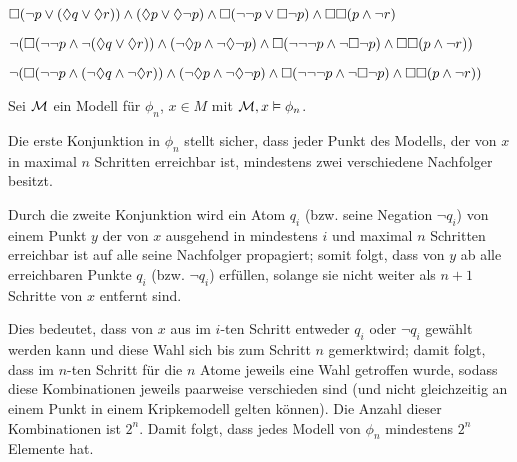 \begin{center}
$ \Box(\neg p \vee (\lozenge q \vee \lozenge r)) \wedge (\lozenge p \vee \lozenge \neg p) \wedge
\Box (\neg \neg p \vee \Box \neg p) \wedge \Box \Box (p \wedge \neg r) $

$ \neg(\Box (\neg\neg p \wedge \neg(\lozenge q \vee \lozenge r)) \wedge (\neg\lozenge p
\wedge \neg\lozenge\neg p) \wedge \Box (\neg\neg\neg p \wedge \neg\Box\neg p) \wedge \Box\Box (p \wedge \neg r)) $

$ \neg(\Box (\neg\neg p \wedge (\neg\lozenge q \wedge \neg\lozenge r)) \wedge (\neg\lozenge p
\wedge \neg\lozenge\neg p) \wedge \Box (\neg\neg\neg p \wedge \neg\Box\neg p) \wedge \Box\Box (p \wedge \neg r)) $
\end{center}







Sei $\mathcal{M}$ ein Modell für $\phi_n$, $x\in M$ mit $\mathcal{M}, x \vDash
\phi_n$.

Die erste Konjunktion in $\phi_n$ stellt sicher, dass jeder Punkt des
Modells, der von $x$ in maximal $n$ Schritten erreichbar ist, mindestens zwei
verschiedene Nachfolger besitzt.

Durch die zweite Konjunktion wird ein Atom $q_i$ (bzw. seine Negation $\neg q_i$)
von einem Punkt $y$ der von $x$ ausgehend in mindestens $i$ und maximal $n$
Schritten erreichbar ist auf alle seine Nachfolger propagiert; somit folgt,
dass von $y$ ab alle erreichbaren Punkte $q_i$ (bzw. $\neg q_i$) erfüllen,
solange sie nicht weiter als $n+1$ Schritte von $x$ entfernt sind.

Dies bedeutet, dass von $x$ aus im $i$-ten Schritt entweder $q_i$ oder $\neg
q_i$ gewählt werden kann und diese Wahl sich bis zum Schritt $n$ \glqq
gemerkt\grqq wird; damit folgt, dass im $n$-ten Schritt für die $n$ Atome
jeweils eine Wahl getroffen wurde, sodass diese Kombinationen jeweils paarweise
verschieden sind (und nicht gleichzeitig an einem Punkt in einem Kripkemodell
gelten können). Die Anzahl dieser Kombinationen ist $2^n$. Damit folgt, dass
jedes Modell von $\phi_n$ mindestens $2^n$ Elemente hat.

